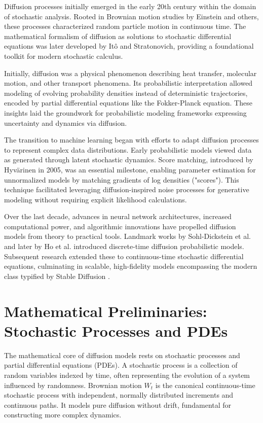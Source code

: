 Diffusion processes initially emerged in the early 20th century within the domain of stochastic analysis. Rooted in Brownian motion studies by Einstein and others, these processes characterized random particle motion in continuous time. The mathematical formalism of diffusion as solutions to stochastic differential equations was later developed by Itô and Stratonovich, providing a foundational toolkit for modern stochastic calculus.

Initially, diffusion was a physical phenomenon describing heat transfer, molecular motion, and other transport phenomena. Its probabilistic interpretation allowed modeling of evolving probability densities instead of deterministic trajectories, encoded by partial differential equations like the Fokker-Planck equation. These insights laid the groundwork for probabilistic modeling frameworks expressing uncertainty and dynamics via diffusion.

The transition to machine learning began with efforts to adapt diffusion processes to represent complex data distributions. Early probabilistic models viewed data as generated through latent stochastic dynamics. Score matching, introduced by Hyvärinen in 2005, was an essential milestone, enabling parameter estimation for unnormalized models by matching gradients of log densities ("scores"). This technique facilitated leveraging diffusion-inspired noise processes for generative modeling without requiring explicit likelihood calculations.

Over the last decade, advances in neural network architectures, increased computational power, and algorithmic innovations have propelled diffusion models from theory to practical tools. Landmark works by Sohl-Dickstein et al. \cite{Sohl-Dickstein2015} and later by Ho et al. \cite{Ho2020} introduced discrete-time diffusion probabilistic models. Subsequent research extended these to continuous-time stochastic differential equations, culminating in scalable, high-fidelity models encompassing the modern class typified by Stable Diffusion \cite{Rombach2022}.

\section{Mathematical Preliminaries: Stochastic Processes and PDEs}

The mathematical core of diffusion models rests on stochastic processes and partial differential equations (PDEs). A stochastic process is a collection of random variables indexed by time, often representing the evolution of a system influenced by randomness. Brownian motion \( W_t \) is the canonical continuous-time stochastic process with independent, normally distributed increments and continuous paths. It models pure diffusion without drift, fundamental for constructing more complex dynamics.

